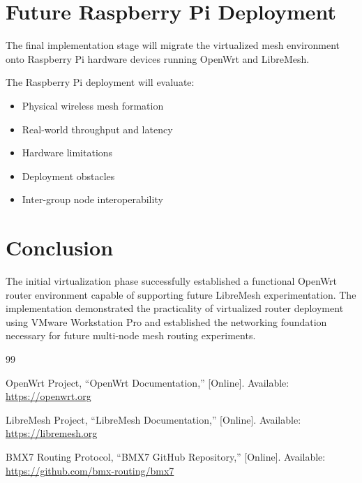 \documentclass[conference]{IEEEtran}
\begin{document}
\section{Future Raspberry Pi Deployment}

The final implementation stage will migrate the virtualized mesh environment onto Raspberry Pi hardware devices running OpenWrt and LibreMesh.

The Raspberry Pi deployment will evaluate:

\begin{itemize}
    \item Physical wireless mesh formation
    \item Real-world throughput and latency
    \item Hardware limitations
    \item Deployment obstacles
    \item Inter-group node interoperability
\end{itemize}

\section{Conclusion}

The initial virtualization phase successfully established a functional OpenWrt router environment capable of supporting future LibreMesh experimentation. The implementation demonstrated the practicality of virtualized router deployment using VMware Workstation Pro and established the networking foundation necessary for future multi-node mesh routing experiments.



\begin{thebibliography}{99}

OpenWrt Project, ``OpenWrt Documentation,'' [Online]. Available: \url{https://openwrt.org}

LibreMesh Project, ``LibreMesh Documentation,'' [Online]. Available: \url{https://libremesh.org}

BMX7 Routing Protocol, ``BMX7 GitHub Repository,'' [Online]. Available: \url{https://github.com/bmx-routing/bmx7}

\end{thebibliography}
\end{document}
